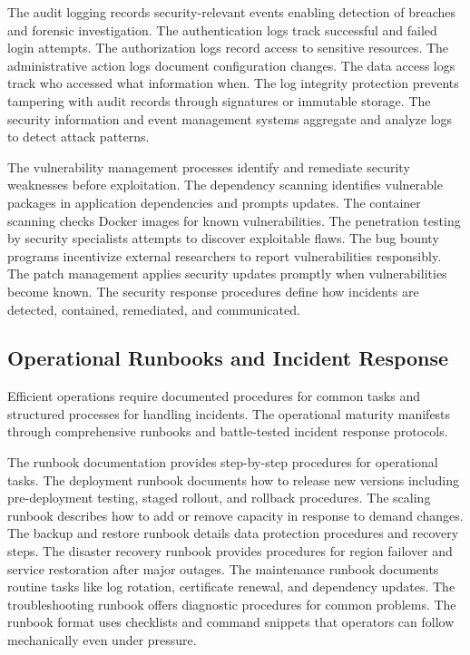 The audit logging records security-relevant events enabling detection of breaches and forensic investigation. The authentication logs track successful and failed login attempts. The authorization logs record access to sensitive resources. The administrative action logs document configuration changes. The data access logs track who accessed what information when. The log integrity protection prevents tampering with audit records through signatures or immutable storage. The security information and event management systems aggregate and analyze logs to detect attack patterns.

The vulnerability management processes identify and remediate security weaknesses before exploitation. The dependency scanning identifies vulnerable packages in application dependencies and prompts updates. The container scanning checks Docker images for known vulnerabilities. The penetration testing by security specialists attempts to discover exploitable flaws. The bug bounty programs incentivize external researchers to report vulnerabilities responsibly. The patch management applies security updates promptly when vulnerabilities become known. The security response procedures define how incidents are detected, contained, remediated, and communicated.

\subsection{Operational Runbooks and Incident Response}

Efficient operations require documented procedures for common tasks and structured processes for handling incidents. The operational maturity manifests through comprehensive runbooks and battle-tested incident response protocols.

The runbook documentation provides step-by-step procedures for operational tasks. The deployment runbook documents how to release new versions including pre-deployment testing, staged rollout, and rollback procedures. The scaling runbook describes how to add or remove capacity in response to demand changes. The backup and restore runbook details data protection procedures and recovery steps. The disaster recovery runbook provides procedures for region failover and service restoration after major outages. The maintenance runbook documents routine tasks like log rotation, certificate renewal, and dependency updates. The troubleshooting runbook offers diagnostic procedures for common problems. The runbook format uses checklists and command snippets that operators can follow mechanically even under pressure.

